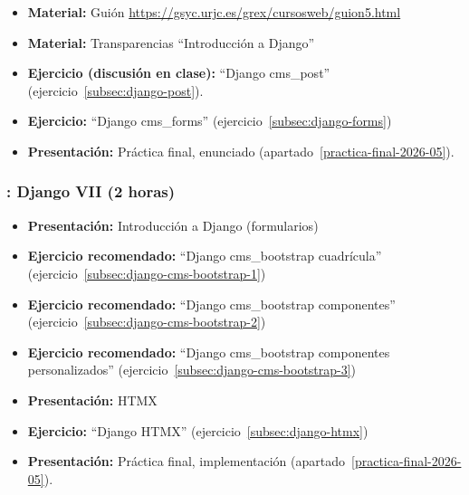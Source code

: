 \documentclass[a4paper,12pt]{article}
\begin{document}
\begin{itemize}
  
   \item \textbf{Material:} Guión \url{https://gsyc.urjc.es/grex/cursosweb/guion5.html}
   \item \textbf{Material:} Transparencias ``Introducción a Django''
   \item \textbf{Ejercicio (discusión en clase):} ``Django cms\_post'' (ejercicio~\ref{subsec:django-post}).
   \item \textbf{Ejercicio:} ``Django cms\_forms'' (ejercicio~\ref{subsec:django-forms}) \\
  \item \textbf{Presentación:} Práctica final, enunciado (apartado~\ref{practica-final-2026-05}).
  \end{itemize}

\subsubsection{\juevesM: Django VII (2 horas)}
\label{cal:juevesM}

\begin{itemize}
  \item \textbf{Presentación:} Introducción a Django (formularios)
  \item \textbf{Ejercicio recomendado:} ``Django cms\_bootstrap cuadrícula'' (ejercicio~\ref{subsec:django-cms-bootstrap-1})
   \item \textbf{Ejercicio recomendado:} ``Django cms\_bootstrap componentes'' (ejercicio~\ref{subsec:django-cms-bootstrap-2})
   \item \textbf{Ejercicio recomendado:} ``Django cms\_bootstrap componentes personalizados'' (ejercicio~\ref{subsec:django-cms-bootstrap-3})
   \item \textbf{Presentación:} HTMX
   \item \textbf{Ejercicio:} ``Django HTMX'' (ejercicio~\ref{subsec:django-htmx})
\item \textbf{Presentación:} Práctica final, implementación (apartado~\ref{practica-final-2026-05}).
\end{itemize}
\end{document}

